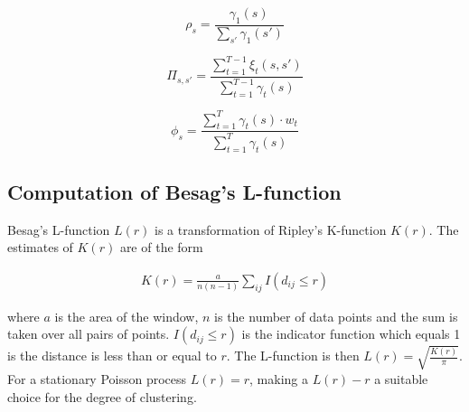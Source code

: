 \documentclass{ucetd}
\begin{document}
\[
\rho_s = \frac{\gamma_1(s)}{\sum_{s'} \gamma_1(s')}
\]

\[
\Pi_{s, s'} = \frac{\sum_{t=1}^{T-1} \xi_t(s, s')}{\sum_{t=1}^{T-1} \gamma_t(s)}
\]

\[
\phi_s = \frac{\sum_{t=1}^{T} \gamma_t(s) \cdot w_t}{\sum_{t=1}^{T} \gamma_t(s)}
\]



\subsection{Computation of Besag's L-function}

Besag's L-function $L(r)$ is a transformation of Ripley's K-function $K(r)$. The estimates of $K(r)$ are of the form 

\begin{align*}
K(r) = \frac{a}{n(n-1)}\sum_{ij} I(d_{ij}\leq r)
\end{align*}

where $a$ is the area of the window, $n$ is the number of data points and the sum is taken over all pairs of points. $I(d_{ij}\leq r)$ is the indicator function which equals 1 is the distance is less than or equal to $r$. The L-function is then $L(r) = \sqrt{\frac{K(r)}{\pi}}$. For a stationary Poisson process $L(r) = r$, making a $L(r)-r$ a suitable choice for the degree of clustering.




\end{document}
